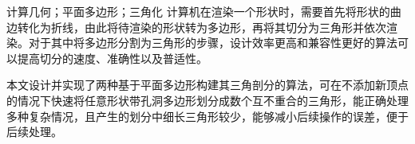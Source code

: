 
\begin{cnabstract}{计算几何；平面多边形；三角化}
  计算机在渲染一个形状时，需要首先将形状的曲边转化为折线，由此将待渲染的形状转为多边形，再将其切分为三角形并依次渲染。对于其中将多边形分割为三角形的步骤，设计效率更高和兼容性更好的算法可以提高切分的速度、准确性以及普适性。
  
  本文设计并实现了两种基于平面多边形构建其三角剖分的算法，可在不添加新顶点的情况下快速将任意形状带孔洞多边形划分成数个互不重合的三角形，能正确处理多种复杂情况，且产生的划分中细长三角形较少，能够减小后续操作的误差，便于后续处理。
\end{cnabstract}





